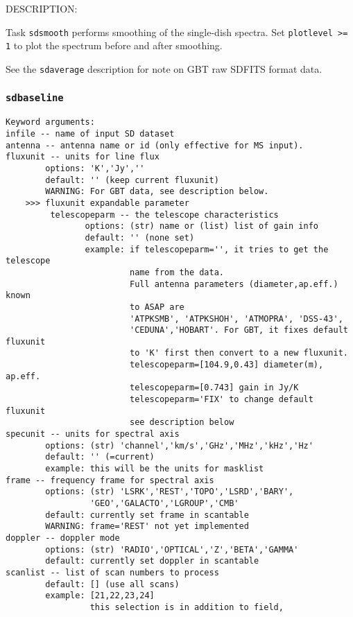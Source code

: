     DESCRIPTION:

Task {\tt sdsmooth} performs smoothing of the single-dish spectra.
Set {\tt plotlevel >= 1} to plot the spectrum before and after smoothing.
    
See the {\tt sdaverage} description for note on GBT raw SDFITS format data.

 
\subsubsection{{\tt sdbaseline}}
\label{section:sd.sdtasks.tasks.sdbaseline}

\begin{verbatim}
Keyword arguments:
infile -- name of input SD dataset
antenna -- antenna name or id (only effective for MS input). 
fluxunit -- units for line flux
        options: 'K','Jy',''
        default: '' (keep current fluxunit)
        WARNING: For GBT data, see description below.
    >>> fluxunit expandable parameter
         telescopeparm -- the telescope characteristics
                options: (str) name or (list) list of gain info
                default: '' (none set)
                example: if telescopeparm='', it tries to get the telescope
                         name from the data.
                         Full antenna parameters (diameter,ap.eff.) known
                         to ASAP are
                         'ATPKSMB', 'ATPKSHOH', 'ATMOPRA', 'DSS-43',
                         'CEDUNA','HOBART'. For GBT, it fixes default fluxunit
                         to 'K' first then convert to a new fluxunit.
                         telescopeparm=[104.9,0.43] diameter(m), ap.eff.
                         telescopeparm=[0.743] gain in Jy/K
                         telescopeparm='FIX' to change default fluxunit
                         see description below
specunit -- units for spectral axis
        options: (str) 'channel','km/s','GHz','MHz','kHz','Hz'
        default: '' (=current)
        example: this will be the units for masklist
frame -- frequency frame for spectral axis
        options: (str) 'LSRK','REST','TOPO','LSRD','BARY',
                 'GEO','GALACTO','LGROUP','CMB'
        default: currently set frame in scantable
        WARNING: frame='REST' not yet implemented
doppler -- doppler mode
        options: (str) 'RADIO','OPTICAL','Z','BETA','GAMMA'
        default: currently set doppler in scantable
scanlist -- list of scan numbers to process
        default: [] (use all scans)
        example: [21,22,23,24]
                 this selection is in addition to field,

\end{verbatim}
